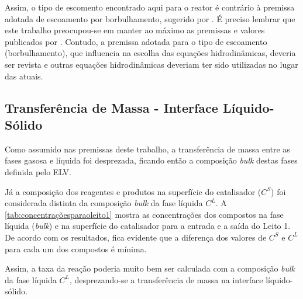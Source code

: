 Assim, o tipo de escomento encontrado aqui para o reator é contrário à premissa
adotada de escoamento por borbulhamento, sugerido por . É
preciso lembrar que este trabalho preocupou-se em manter ao máximo as premissas
e valores publicados por . Contudo, a premissa adotada
para o tipo de escoamento (borbulhamento), que influencia na escolha das
equações hidrodinâmicas, deveria ser revista e outras equações hidrodinâmicas
deveriam ter sido utilizadas no lugar das atuais.

\subsection{Transferência de Massa - Interface Líquido-Sólido}
\label{transferênciademassainterfaceliquidosolido}

Como assumido nas premissas deste trabalho, a transferência de massa entre as
fases gasosa e líquida foi desprezada, ficando então a composição \emph{bulk}
destas fases definida pelo ELV.

Já a composição dos reagentes e produtos na superfície do catalisador ($C^S$)
foi considerada distinta da composição \emph{bulk} da fase líquida $C^L$. A
\autoref{tab:concentraçõesparaoleito1} mostra as concentrações dos compostos na
fase líquida (\emph{bulk}) e na superfície do catalisador para a entrada e a
saída do Leito 1. De acordo com os resultados, fica evidente que a diferença dos
valores de $C^S$ e $C^L$ para cada um dos compostos é mínima.

Assim, a taxa da reação poderia muito bem ser calculada com a composição
\emph{bulk} da fase líquida $C^L$, desprezando-se a transferência de massa na
interface líquido-sólido.

